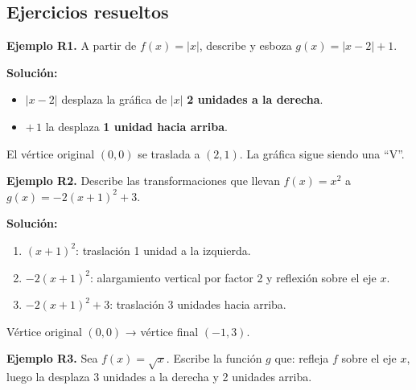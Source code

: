 \documentclass[12pt, letterpaper]{article}
\begin{document}
\subsection{Ejercicios resueltos}

\textbf{Ejemplo R1.} A partir de $f(x) = |x|$, describe y esboza $g(x) = |x - 2| + 1$.

\begin{cuadrosolucion}
  \textbf{Solución:}
  \begin{itemize}
    \item $|x - 2|$ desplaza la gráfica de $|x|$ \textbf{2 unidades a la derecha}.
    \item $+\,1$ la desplaza \textbf{1 unidad hacia arriba}.
  \end{itemize}
  El vértice original $(0, 0)$ se traslada a $(2, 1)$. La gráfica sigue siendo una ``V''.
  \begin{center}
  \end{center}
\end{cuadrosolucion}
\newpage
\textbf{Ejemplo R2.} Describe las transformaciones que llevan $f(x) = x^2$ a $g(x) = -2(x + 1)^2 + 3$.

\begin{cuadrosolucion}
  \textbf{Solución:}
  \begin{enumerate}
    \item $(x + 1)^2$: traslación 1 unidad a la izquierda.
    \item $-2(x + 1)^2$: alargamiento vertical por factor 2 y reflexión sobre el eje $x$.
    \item $-2(x + 1)^2 + 3$: traslación 3 unidades hacia arriba.
  \end{enumerate}
  Vértice original $(0, 0)$ → vértice final $(-1, 3)$.
\end{cuadrosolucion}

\textbf{Ejemplo R3.} Sea $f(x) = \sqrt{x}$. Escribe la función $g$ que: refleja $f$ sobre el eje $x$, luego la desplaza 3 unidades a la derecha y 2 unidades arriba.
\end{document}

